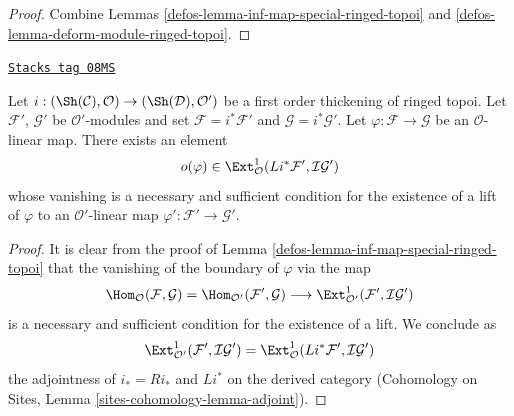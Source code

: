 \begin{proof}

Combine Lemmas \ref{defos-lemma-inf-map-special-ringed-topoi} and
\ref{defos-lemma-deform-module-ringed-topoi}.
\end{proof}

\begin{lemma}
\label{defos-lemma-inf-obs-map-special-ringed-topoi}
\href{https://stacks.math.columbia.edu/tag/08MS}{\texttt{Stacks tag 08MS}}

Let $i : (\Sh(\mathcal{C}), \mathcal{O}) \to (\Sh(\mathcal{D}), \mathcal{O}')$
be a first order thickening of ringed topoi.
Let $\mathcal{F}'$, $\mathcal{G}'$ be $\mathcal{O}'$-modules and set
$\mathcal{F} = i^*\mathcal{F}'$ and $\mathcal{G} = i^*\mathcal{G}'$.
Let $\varphi : \mathcal{F} \to \mathcal{G}$ be an $\mathcal{O}$-linear map.
There exists an element
$$
o(\varphi) \in
\Ext^1_\mathcal{O}(Li^*\mathcal{F}', \mathcal{I}\mathcal{G}')
$$
whose vanishing is a necessary and sufficient condition for the
existence of a lift of $\varphi$ to an $\mathcal{O}'$-linear map
$\varphi' : \mathcal{F}' \to \mathcal{G}'$.
\end{lemma}

\begin{proof}

It is clear from the proof of Lemma \ref{defos-lemma-inf-map-special-ringed-topoi}
that the vanishing of the boundary of $\varphi$ via the map
$$
\Hom_\mathcal{O}(\mathcal{F}, \mathcal{G}) =
\Hom_{\mathcal{O}'}(\mathcal{F}', \mathcal{G}) \longrightarrow
\Ext^1_{\mathcal{O}'}(\mathcal{F}', \mathcal{I}\mathcal{G}')
$$
is a necessary and sufficient condition for the existence of a lift. We
conclude as
$$
\Ext^1_{\mathcal{O}'}(\mathcal{F}', \mathcal{I}\mathcal{G}') =
\Ext^1_\mathcal{O}(Li^*\mathcal{F}', \mathcal{I}\mathcal{G}')
$$
the adjointness of $i_* = Ri_*$ and $Li^*$ on the derived category
(Cohomology on Sites, Lemma \ref{sites-cohomology-lemma-adjoint}).
\end{proof}

